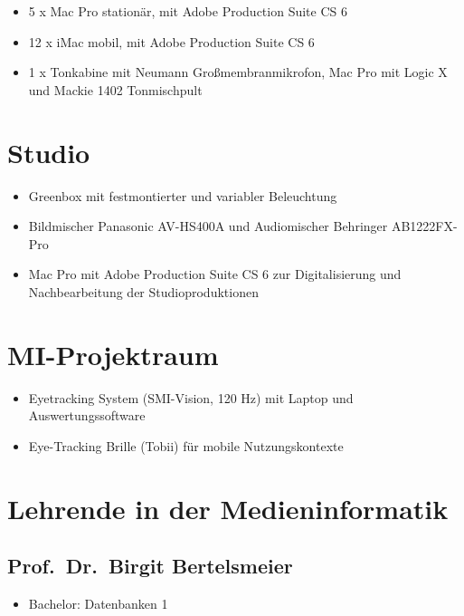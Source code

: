 \begin{itemize}
\tightlist
\item
  5 x Mac Pro stationär, mit Adobe Production Suite CS 6
\item
  12 x iMac mobil, mit Adobe Production Suite CS 6
\item
  1 x Tonkabine mit Neumann Großmembranmikrofon, Mac Pro mit Logic X und
  Mackie 1402 Tonmischpult
\end{itemize}

\section{Studio}\label{studio}

\begin{itemize}
\tightlist
\item
  Greenbox mit festmontierter und variabler Beleuchtung
\item
  Bildmischer Panasonic AV-HS400A und Audiomischer Behringer
  AB1222FX-Pro
\item
  Mac Pro mit Adobe Production Suite CS 6 zur Digitalisierung und
  Nachbearbeitung der Studioproduktionen
\end{itemize}

\section{MI-Projektraum}\label{mi-projektraum}

\begin{itemize}
\tightlist
\item
  Eyetracking System (SMI-Vision, 120 Hz) mit Laptop und
  Auswertungssoftware
\item
  Eye-Tracking Brille (Tobii) für mobile Nutzungskontexte
\end{itemize}

\section{Lehrende in der
Medieninformatik}\label{lehrende-in-der-medieninformatik}

\subsection{Prof.~Dr.~Birgit
Bertelsmeier}\label{prof.dr.birgit-bertelsmeier}

\begin{itemize}
\tightlist
\item
  Bachelor: Datenbanken 1
\end{itemize}

